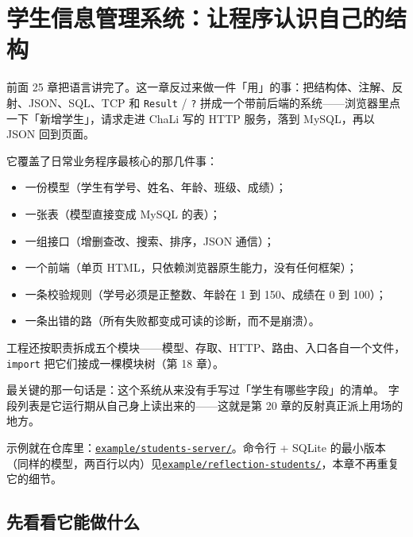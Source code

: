 \chapter{学生信息管理系统：让程序认识自己的结构}
\label{ch:26}

前面 25 章把语言讲完了。这一章反过来做一件「用」的事：把结构体、注解、反射、JSON、SQL、TCP 和 \texttt{Result} / \texttt{?} 拼成一个带前后端的系统——浏览器里点一下「新增学生」，请求走进 ChaLi 写的 HTTP 服务，落到 MySQL，再以 JSON 回到页面。

它覆盖了日常业务程序最核心的那几件事：

\begin{itemize}

\item 一份模型（学生有学号、姓名、年龄、班级、成绩）；

\item 一张表（模型直接变成 MySQL 的表）；

\item 一组接口（增删查改、搜索、排序，JSON 通信）；

\item 一个前端（单页 HTML，只依赖浏览器原生能力，没有任何框架）；

\item 一条校验规则（学号必须是正整数、年龄在 1 到 150、成绩在 0 到 100）；

\item 一条出错的路（所有失败都变成可读的诊断，而不是崩溃）。

\end{itemize}

工程还按职责拆成五个模块——模型、存取、HTTP、路由、入口各自一个文件，\texttt{import} 把它们接成一棵模块树（第 18 章）。

最关键的那一句话是：这个系统从来没有手写过「学生有哪些字段」的清单。 字段列表是它运行期从自己身上读出来的——这就是第 20 章的反射真正派上用场的地方。

示例就在仓库里：\href{https://github.com/rabbitc999/ChaLi/tree/master/example/students-server}{\texttt{example/\allowbreak{}students-server/\allowbreak{}}}。命令行 + SQLite 的最小版本（同样的模型，两百行以内）见\href{https://github.com/rabbitc999/ChaLi/blob/master/example/reflection-students/README.md}{\texttt{example/\allowbreak{}reflection-students/\allowbreak{}}}，本章不再重复它的细节。

\section{先看看它能做什么}

